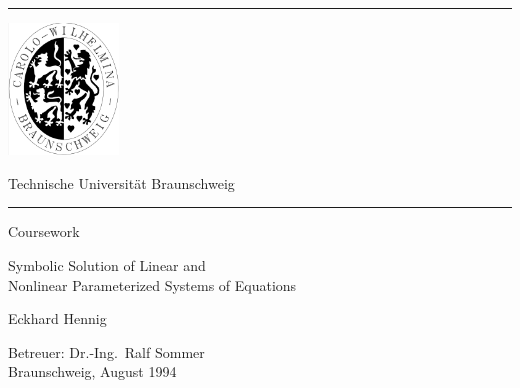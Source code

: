 \documentclass[11pt]{report}           %
\begin{document}

\pagestyle{empty}
\begin{titlepage}
\setcounter{page}{-1}
\hrule

\vspace{5mm}
\noindent
\begin{minipage}[t]{3.5cm}
\rule{0pt}{0pt}

\includegraphics[height=3.5cm]{tubs1.png}

\vspace{6mm}
\end{minipage}
\hfill
\begin{minipage}[t]{12.4cm}
\begin{center}
\tu 

\vspace{0.5ex}
Technische Universit\"at Braunschweig\\[1cm]
\end{center}
\end{minipage}
\hrule

\vspace{2cm}

\begin{center}
\LARGE
Coursework

\vspace{2cm}

\huge Symbolic Solution of Linear and\\
Nonlinear Parameterized Systems of Equations

\vspace{2cm}
\LARGE Eckhard Hennig

\vspace{4cm}
\Large Betreuer: Dr.-Ing.\ Ralf Sommer\\[\baselineskip]
Braunschweig, August 1994
\end{center}

\end{titlepage}
\thispagestyle{empty}
\end{document}
